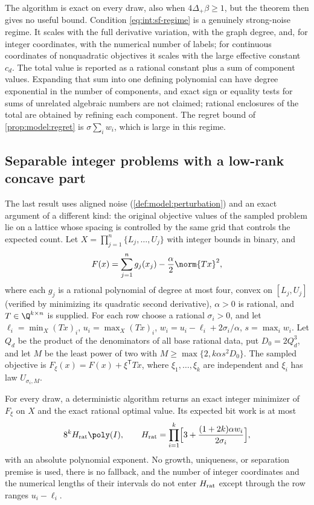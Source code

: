 The algorithm is exact on every draw, also when $4\Delta_+\beta\ge1$, but the
theorem then gives no useful bound. Condition \eqref{eq:int:sf-regime} is a
genuinely strong-noise regime. It scales with the full derivative variation,
with the graph degree, and, for integer coordinates, with the numerical number
of labels; for continuous coordinates of nonquadratic objectives it scales
with the large effective constant $c_d$. The total value is reported as a
rational constant plus a sum of component values. Expanding that sum into one
defining polynomial can have degree exponential in the number of components,
and exact sign or equality tests for sums of unrelated algebraic numbers are
not claimed; rational enclosures of the total are obtained by refining each
component. The regret bound of \cref{prop:model:regret} is
$\sigma\sum_iw_i$, which is large in this regime.

\subsection{Separable integer problems with a low-rank concave part}\label{sec:int:lowrank}

The last result uses aligned noise (\cref{def:model:perturbation}) and an exact
argument of a different kind: the original objective values of the sampled
problem lie on a lattice whose spacing is controlled by the same grid that
controls the expected count. Let $X=\prod_{j=1}^n\{L_j,\ldots,U_j\}$ with
integer bounds in binary, and
\begin{equation}\label{eq:int:lowrank-model}
 F(x)=\sum_{j=1}^ng_j(x_j)-\frac\alpha2\norm{Tx}^2,
\end{equation}
where each $g_j$ is a rational polynomial of degree at most four, convex on
$[L_j,U_j]$ (verified by minimizing its quadratic second derivative), $\alpha>0$
is rational, and $T\in\Q^{k\times n}$ is supplied. For each row choose a
rational $\sigma_i>0$, and let $\ell_i=\min_X(Tx)_i$, $u_i=\max_X(Tx)_i$,
$w_i=u_i-\ell_i+2\sigma_i/\alpha$, $s=\max_iw_i$. Let $Q_d$ be the product of
the denominators of all base rational data, put $D_0=2Q_d^3$, and let $M$ be the
least power of two with $M\ge\max\{2,k\alpha s^2D_0\}$. The sampled objective
is $F_\xi(x)=F(x)+\xi^{\mathsf T}Tx$, where $\xi_1,\ldots,\xi_k$ are independent
and $\xi_i$ has law $U_{\sigma_i,M}$.

\begin{theorem}\label{thm:int:lowrank}
For every draw, a deterministic algorithm returns an exact integer minimizer
of $F_\xi$ on $X$ and the exact rational optimal value. Its expected bit work is
at most
\[
 8^kH_{\rm rat}\poly(I),\qquad
 H_{\rm rat}=\prod_{i=1}^k\Bigl[3+\frac{(1+2k)\alpha w_i}{2\sigma_i}\Bigr],
\]
with an absolute polynomial exponent. No growth, uniqueness, or separation
premise is used, there is no fallback, and the number of integer coordinates
and the numerical lengths of their intervals do not enter $H_{\rm rat}$ except
through the row ranges $u_i-\ell_i$.
\end{theorem}

